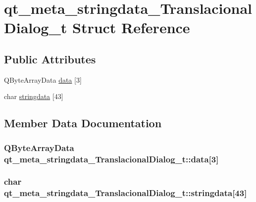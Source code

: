 \hypertarget{structqt__meta__stringdata___translacional_dialog__t}{\section{qt\-\_\-meta\-\_\-stringdata\-\_\-\-Translacional\-Dialog\-\_\-t Struct Reference}
\label{structqt__meta__stringdata___translacional_dialog__t}
}
\subsection*{Public Attributes}
\begin{DoxyCompactItemize}
\item 
Q\-Byte\-Array\-Data \hyperlink{structqt__meta__stringdata___translacional_dialog__t_ae5f9a7608339f516ba49ead69d10c606}{data} \mbox{[}3\mbox{]}
\item 
char \hyperlink{structqt__meta__stringdata___translacional_dialog__t_a00bc0aa4700f1360cec920b011a89bcc}{stringdata} \mbox{[}43\mbox{]}
\end{DoxyCompactItemize}


\subsection{Member Data Documentation}
\hypertarget{structqt__meta__stringdata___translacional_dialog__t_ae5f9a7608339f516ba49ead69d10c606}{
\subsubsection[{data}]{\setlength{\rightskip}{0pt plus 5cm}Q\-Byte\-Array\-Data qt\-\_\-meta\-\_\-stringdata\-\_\-\-Translacional\-Dialog\-\_\-t\-::data\mbox{[}3\mbox{]}}}\label{structqt__meta__stringdata___translacional_dialog__t_ae5f9a7608339f516ba49ead69d10c606}
\hypertarget{structqt__meta__stringdata___translacional_dialog__t_a00bc0aa4700f1360cec920b011a89bcc}{
\subsubsection[{stringdata}]{\setlength{\rightskip}{0pt plus 5cm}char qt\-\_\-meta\-\_\-stringdata\-\_\-\-Translacional\-Dialog\-\_\-t\-::stringdata\mbox{[}43\mbox{]}}}\label{structqt__meta__stringdata___translacional_dialog__t_a00bc0aa4700f1360cec920b011a89bcc}


